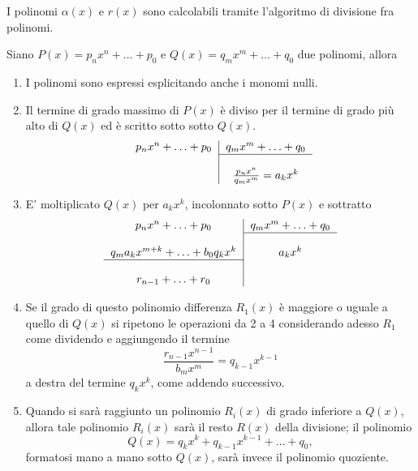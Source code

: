 I polinomi $\alpha(x)$ e $r(x)$ sono calcolabili tramite l'algoritmo di divisione fra polinomi.

\begin{definition}\label{def:algoritmo_divisione_polinomi}
    Siano $P(x)=p_nx^n+\hdots+ p_0$ e $Q(x)=q_mx^m+\hdots+q_0$ due \gls{polinomi}, allora
    \begin{enumerate}
        \item I polinomi sono espressi esplicitando anche i monomi nulli.
        \item Il termine di grado massimo di $P(x)$ è diviso per il  termine di grado più alto di $Q(x)$ ed è scritto sotto sotto $Q(x)$.\\
        \begin{equation*}
        	\begin{tabular}{c|c}
        		$ p_nx^n+\hdots+ p_0$ & $q_mx^m+\hdots+q_0$\\
        		\cline{2-2}\\
        		& $\frac{p_nx^n}{q_mx^m}=a_kx^k$
        	\end{tabular}
        \end{equation*}
        \item E' moltiplicato $Q(x)$ per $a_kx^k$, incolonnato sotto $P(x)$ e sottratto\\
        \begin{equation*}
        	\begin{tabular}{c|c}
        		$ p_nx^n+\hdots+ p_0$ & $q_mx^m+\hdots+q_0$\\
        		\cline{2-2}\\
        		$q_ma_kx^{m+k}+\hdots + b_0q_kx^k$ & $a_kx^k$\\
        		\cline{1-1}\\
        		$r_{n-1}+\hdots+r_0$&\\
        	\end{tabular}
        \end{equation*}
        \item Se il grado di questo polinomio differenza $R_1(x)$ è maggiore o uguale a quello di $Q(x)$ si ripetono le operazioni da 2 a 4 considerando adesso $R_1$ come dividendo e aggiungendo il termine 
        \begin{equation*}
            \frac {r_{n-1}x^{n-1}}{b_{m}x^{m}}=q_{k-1}x^{k-1}
        \end{equation*}
        a destra del termine $q_{k}x^{k}$, come addendo successivo.
        \item Quando si sarà raggiunto un polinomio $R_{i}(x)$ di grado inferiore a $Q(x)$, allora tale polinomio $R_{i}(x)$ sarà il resto $R(x)$ della divisione; il polinomio
        \begin{equation*}
             Q(x)=q_{k}x^{k}+q_{k-1}x^{k-1}+\hdots+q_{0},
        \end{equation*}
        formatosi mano a mano sotto $Q(x)$, sarà invece il polinomio quoziente. 
    \end{enumerate}
\end{definition}

